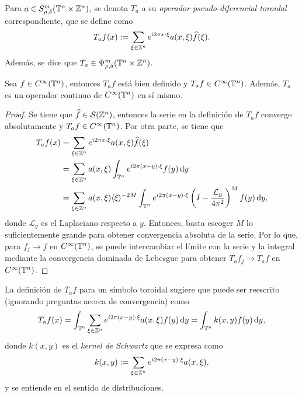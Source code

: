 \begin{definition}
	Para $a\in S^m_{\rho, \delta}(\mathbb{T}^n\times\mathbb{Z}^n)$, se denota $T_a$ a su \textit{operador pseudo-diferencial toroidal} correspondiente, que se define como 
	\begin{equation*}
		T_af(x) := \sum_{\xi\in\mathbb{Z}^n} e^{i2\pi x\cdot\xi} a(x, \xi)\widehat{f}(\xi).
	\end{equation*}
	Además, se dice que $T_a\in\Psi^m_{\rho, \delta}(\mathbb{T}^n\times\mathbb{Z}^n)$.
\end{definition}
\begin{proposition}
	Sea $f\in C^\infty(\mathbb{T}^n)$, entonces $T_af$ está bien definido y $T_af\in C^\infty(\mathbb{T}^n)$. Además, $T_a$ es un operador continuo de $C^\infty(\mathbb{T}^n)$ en sí mismo.
\end{proposition}
\begin{proof}
	Se tiene que $\widehat{f}\in\mathcal{S}(\mathbb{Z}^n)$, entonces la serie en la definición de $T_af$ converge absolutamente y $T_af\in C^\infty(\mathbb{T}^n)$. Por otra parte, se tiene que
	\begin{align*}
		T_af(x) &= \sum_{\xi\in\mathbb{Z}^n}e^{i2\pi x\cdot\xi} a(x, \xi) \widehat{f}(\xi) \\
		& = \sum_{\xi\in\mathbb{Z}^n}a(x, \xi) \int_{\mathbb{T}^n} e^{i2\pi (x-y)\cdot\xi} f(y) \mathop{}\!\mathrm{d} y\\
		& = \sum_{\xi\in\mathbb{Z}^n}a(x, \xi)\langle\xi\rangle^{-2M} \int_{\mathbb{T}^n} e^{i2\pi (x-y)\cdot\xi} \left(I-\frac{\mathcal{L}_y}{4\pi^2}\right)^M f(y) \mathop{}\!\mathrm{d} y,
	\end{align*}
	donde $\mathcal{L}_y$ es el Laplaciano respecto a $y$. Entonces, basta escoger $M$ lo suficientemente grande para obtener convergencia absoluta de la serie. Por lo que, para $f_j\to f$ en $C^\infty(\mathbb{T}^n)$, se puede intercambiar el límite con la serie y la integral mediante la convergencia dominada de Lebesgue para obtener $T_af_j\to T_af$ en $C^\infty(\mathbb{T}^n)$.
\end{proof}
\begin{remark}
	La definición de $T_af$ para un símbolo toroidal sugiere que puede ser reescrito (ignorando preguntas acerca de convergencia) como 
	\begin{equation*}
		T_af(x) = \int_{\mathbb{T}^n} \sum_{\xi\in\mathbb{Z}^n} e^{i2\pi (x-y)\cdot\xi} a(x, \xi) f(y) \mathop{}\!\mathrm{d} y =\int_{\mathbb{T}^n} k(x, y)f(y)\mathop{}\!\mathrm{d} y,
	\end{equation*}
	donde $k(x, y)$ es el \textit{kernel de Schwartz} que se expresa como 
	\begin{equation*}
		k(x, y) := \sum_{\xi\in\mathbb{Z}^n} e^{i2\pi (x-y)\cdot\xi} a(x, \xi),
	\end{equation*}
	y se entiende en el sentido de distribuciones. 
\end{remark}
